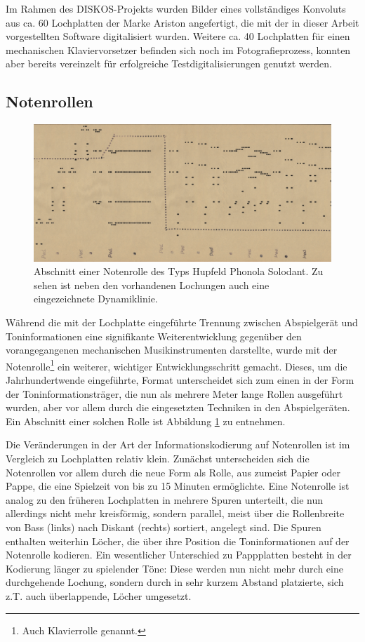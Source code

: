 Im Rahmen des DISKOS-Projekts wurden Bilder eines vollständiges Konvoluts aus ca. 60 Lochplatten der Marke Ariston angefertigt, die mit der in dieser Arbeit vorgestellten Software digitalisiert wurden.
Weitere ca. 40 Lochplatten für einen mechanischen Klaviervorsetzer befinden sich noch im Fotografieprozess, konnten aber bereits vereinzelt für erfolgreiche Testdigitalisierungen genutzt werden.

\subsection{Notenrollen}

\begin{figure}[t]
    \centering
    \includegraphics[width=\textwidth]{graphics/pianoroll.png}
    \caption{Abschnitt einer Notenrolle des Typs Hupfeld Phonola Solodant. Zu sehen ist neben den vorhandenen Lochungen auch eine eingezeichnete Dynamiklinie.}
    \label{pianoroll}
\end{figure}

Während die mit der Lochplatte eingeführte Trennung zwischen Abspielgerät und Toninformationen eine signifikante Weiterentwicklung gegenüber den vorangegangenen mechanischen Musikinstrumenten darstellte, wurde mit der Notenrolle\footnote{Auch Klavierrolle genannt.} ein weiterer, wichtiger Entwicklungsschritt gemacht.
Dieses, um die Jahrhundertwende eingeführte, Format unterscheidet sich zum einen in der Form der Toninformationsträger, die nun als mehrere Meter lange Rollen ausgeführt wurden, aber vor allem durch die eingesetzten Techniken in den Abspielgeräten.
Ein Abschnitt einer solchen Rolle ist Abbildung \ref{pianoroll} zu entnehmen.

Die Veränderungen in der Art der Informationskodierung auf Notenrollen ist im Vergleich zu Lochplatten relativ klein.
Zunächst unterscheiden sich die Notenrollen vor allem durch die neue Form als Rolle, aus zumeist Papier oder Pappe, die eine Spielzeit von bis zu 15 Minuten ermöglichte.
Eine Notenrolle ist analog zu den früheren Lochplatten in mehrere Spuren unterteilt, die nun allerdings nicht mehr kreisförmig, sondern parallel, meist über die Rollenbreite von Bass (links) nach Diskant (rechts) sortiert, angelegt sind.
Die Spuren enthalten weiterhin Löcher, die über ihre Position die Toninformationen auf der Notenrolle kodieren.
Ein wesentlicher Unterschied zu Pappplatten besteht in der Kodierung länger zu spielender Töne: Diese werden nun nicht mehr durch eine durchgehende Lochung, sondern durch in sehr kurzem Abstand platzierte, sich z.T. auch überlappende, Löcher umgesetzt.

